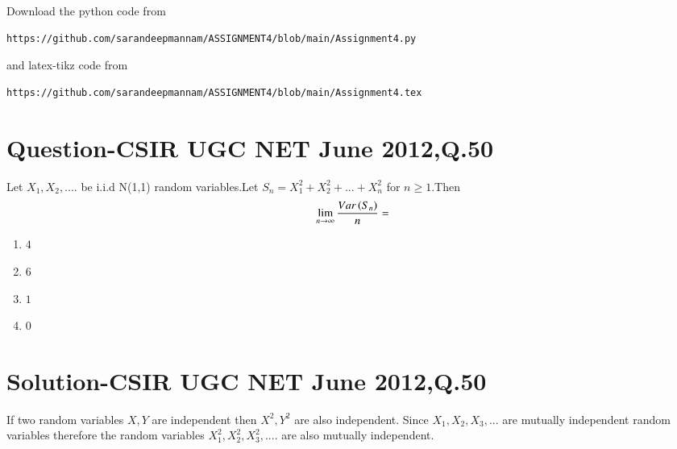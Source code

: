 \documentclass[journal,12pt,twocolumn]{IEEEtran}
\begin{document}
Download the python code from 
\begin{lstlisting}
https://github.com/sarandeepmannam/ASSIGNMENT4/blob/main/Assignment4.py
\end{lstlisting}
%
and latex-tikz code from 
%
\begin{lstlisting}
https://github.com/sarandeepmannam/ASSIGNMENT4/blob/main/Assignment4.tex
\end{lstlisting}
\section{Question-CSIR UGC NET June 2012,Q.50}
Let $X_{1},X_{2},....$ be i.i.d N(1,1) random variables.Let $S_{n}=X_{1}^{2}+X_{2}^2+...+X_{n}^{2}$ for $n\ge1$.Then $$\lim_{n \to \infty}{\frac{Var\left(S_{n}\right)}{n}}=$$
\begin{enumerate}[label = (\Alph*)]
\item  $4$
\item  $6$
\item  $1$
\item  $0$
\end{enumerate}

\section{Solution-CSIR UGC NET June 2012,Q.50}

If two random variables $X,Y$ are independent then $X^2,Y^2$ are also independent.
Since $X_{1},X_{2},X_{3},...$ are mutually independent random variables therefore the random variables $X_{1}^{2},X_{2}^{2},X_{3}^{2},....$  are also mutually independent.
\end{document}
